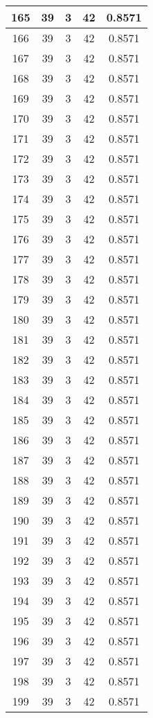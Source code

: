 \documentclass[letterpaper, 12pt]{article}
\begin{document}
\begin{longtable}{|c|c|c|c|c|}
\hline
165 & 39 & 3 & 42 & 0.8571 \\
\hline
166 & 39 & 3 & 42 & 0.8571 \\
\hline
167 & 39 & 3 & 42 & 0.8571 \\
\hline
168 & 39 & 3 & 42 & 0.8571 \\
\hline
169 & 39 & 3 & 42 & 0.8571 \\
\hline
170 & 39 & 3 & 42 & 0.8571 \\
\hline
171 & 39 & 3 & 42 & 0.8571 \\
\hline
172 & 39 & 3 & 42 & 0.8571 \\
\hline
173 & 39 & 3 & 42 & 0.8571 \\
\hline
174 & 39 & 3 & 42 & 0.8571 \\
\hline
175 & 39 & 3 & 42 & 0.8571 \\
\hline
176 & 39 & 3 & 42 & 0.8571 \\
\hline
177 & 39 & 3 & 42 & 0.8571 \\
\hline
178 & 39 & 3 & 42 & 0.8571 \\
\hline
179 & 39 & 3 & 42 & 0.8571 \\
\hline
180 & 39 & 3 & 42 & 0.8571 \\
\hline
181 & 39 & 3 & 42 & 0.8571 \\
\hline
182 & 39 & 3 & 42 & 0.8571 \\
\hline
183 & 39 & 3 & 42 & 0.8571 \\
\hline
184 & 39 & 3 & 42 & 0.8571 \\
\hline
185 & 39 & 3 & 42 & 0.8571 \\
\hline
186 & 39 & 3 & 42 & 0.8571 \\
\hline
187 & 39 & 3 & 42 & 0.8571 \\
\hline
188 & 39 & 3 & 42 & 0.8571 \\
\hline
189 & 39 & 3 & 42 & 0.8571 \\
\hline
190 & 39 & 3 & 42 & 0.8571 \\
\hline
191 & 39 & 3 & 42 & 0.8571 \\
\hline
192 & 39 & 3 & 42 & 0.8571 \\
\hline
193 & 39 & 3 & 42 & 0.8571 \\
\hline
194 & 39 & 3 & 42 & 0.8571 \\
\hline
195 & 39 & 3 & 42 & 0.8571 \\
\hline
196 & 39 & 3 & 42 & 0.8571 \\
\hline
197 & 39 & 3 & 42 & 0.8571 \\
\hline
198 & 39 & 3 & 42 & 0.8571 \\
\hline
199 & 39 & 3 & 42 & 0.8571 \\
\hline
\end{longtable}
\end{document}
